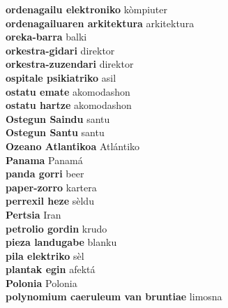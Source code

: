 \textbf{ ordenagailu elektroniko  } kòmpiuter \\
\textbf{ ordenagailuaren arkitektura  } arkitektura \\
\textbf{ oreka-barra  } balki \\
\textbf{ orkestra-gidari  } direktor \\
\textbf{ orkestra-zuzendari  } direktor \\
\textbf{ ospitale psikiatriko  } asil \\
\textbf{ ostatu emate  } akomodashon \\
\textbf{ ostatu hartze  } akomodashon \\
\textbf{ Ostegun Saindu  } santu \\
\textbf{ Ostegun Santu  } santu \\
\textbf{ Ozeano Atlantikoa  } Atlántiko \\
\textbf{ Panama  } Panamá \\
\textbf{ panda gorri  } beer \\
\textbf{ paper-zorro  } kartera \\
\textbf{ perrexil heze  } sèldu \\
\textbf{ Pertsia  } Iran \\
\textbf{ petrolio gordin  } krudo \\
\textbf{ pieza landugabe  } blanku \\
\textbf{ pila elektriko  } sèl \\
\textbf{ plantak egin  } afektá \\
\textbf{ Polonia  } Polonia \\
\textbf{ polynomium caeruleum van bruntiae  } limosna \\
